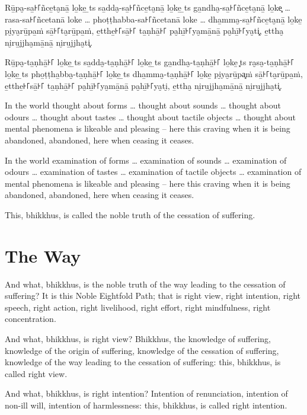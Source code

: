 Rū̱pa̮-sa̱꜔꜒ñce̱ta̮nā̱ lo̱ke̱ \ldo̱ts{} sa̱dda̮-sa̱꜔꜒ñce̱ta̮nā̱ lo̱ke̱ \ldo̱ts{} ga̱ndha̮-sa̱꜔꜒ñce̱ta̮nā̱ lo̱ke͓
\ldots{} rasa-sa꜔꜒ñcetanā loke \ldots{} phoṭṭhabba-sa꜔꜒ñcetanā loke \ldots{}
dha̱mma̮-sa̱꜔꜒ñce̱ta̮nā̱ lo̱ke̱ pi̮ya̮rū̱pa̱ṁ sā̱꜔꜒ta̮rū̱pa̱ṁ, e̱tthe̱꜔꜒sā̱꜔꜒ ta̱ṇhā̱꜔꜒ pa̮hī̱꜔꜒ya̮mā̱nā̱ pa̮hī̱꜔꜒ya̮ti͓,
e̱ttha̮ ni̮ru̱jjha̮mā̱nā̱ ni̮ru̱jjha̮ti͓.

Rū̱pa̮-ta̱ṇhā̱꜔꜒ lo̱ke̱ \ldo̱ts{} sa̱dda̮-ta̱ṇhā̱꜔꜒ lo̱ke̱ \ldo̱ts{} ga̱ndha̮-ta̱ṇhā̱꜔꜒ lo̱ke̱ \ldo͓ts{}
ra̮sa̮-ta̱ṇhā̱꜔꜒ lo̱ke̱ \ldo̱ts{} pho̱ṭṭha̱bba̮-ta̱ṇhā̱꜔꜒ lo̱ke̱ \ldo̱ts{} dha̱mma̮-ta̱ṇhā̱꜔꜒ lo̱ke̱ pi̮ya̮rū̱pa͓ṁ
sā̱꜔꜒ta̮rū̱pa̱ṁ, e̱tthe̱꜔꜒sā̱꜔꜒ ta̱ṇhā̱꜔꜒ pa̮hī̱꜔꜒ya̮mā̱nā̱ pa̮hī̱꜔꜒ya̮ti̮, e̱ttha̮ ni̮ru̱jjha̮mā̱nā̱ ni̮ru̱jjha̮ti͓.

\englishPage

In the world thought about forms \ldots{} thought about sounds \ldots{} thought
about odours \ldots{} thought about tastes \ldots{} thought about tactile
objects \ldots{} thought about mental phenomena is likeable and pleasing -- here
this craving when it is being abandoned, abandoned, here when ceasing it ceases.

In the world examination of forms \ldots{} examination of sounds \ldots{}
examination of odours \ldots{} examination of tastes \ldots{} examination of
tactile objects \ldots{} examination of mental phenomena is likeable and
pleasing -- here this craving when it is being abandoned, abandoned, here when
ceasing it ceases.

This, bhikkhus, is called the noble truth of the cessation of suffering.

\section{The Way}

And what, bhikkhus, is the noble truth of the way leading to the cessation of
suffering? It is this Noble Eightfold Path; that is right view, right intention,
right speech, right action, right livelihood, right effort, right mindfulness,
right concentration.

And what, bhikkhus, is right view? Bhikkhus, the knowledge of suffering,
knowledge of the origin of suffering, knowledge of the cessation of suffering,
knowledge of the way leading to the cessation of suffering: this, bhikkhus, is
called right view.

And what, bhikkhus, is right intention? Intention of renunciation, intention of
non-ill will, intention of harmlessness: this, bhikkhus, is called right
intention.

